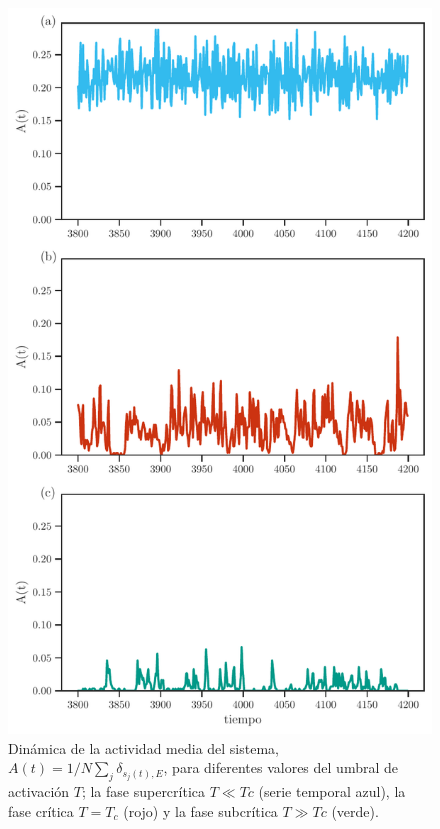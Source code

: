 \begin{figure}[h!]
	\centering\includegraphics[width=\imsize]{actividad_activos_hermafrodita.pdf}
	\caption[Dinámica de la actividad media del sistema , $A(t) = 1/N \sum_j \delta_{s_j(t),E}$, para diferentes valores del umbral de activación $T$. ]{Dinámica de la actividad media del sistema, $A(t) = 1/N \sum_j \delta_{s_j(t),E}$, para diferentes valores del umbral de activación $T$; la fase supercrítica $T \ll Tc$ (serie temporal azul), la fase crítica $T = T_c$ (rojo) y la fase subcrítica $T \gg Tc$ (verde). }\label{fig:actividad_activos}
\end{figure}



